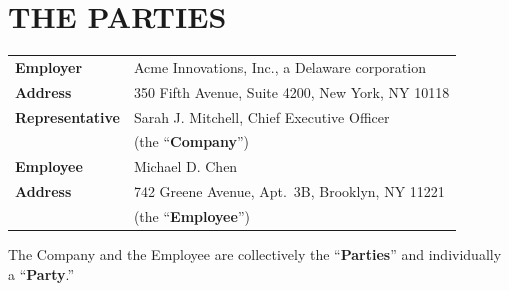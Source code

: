 \section{THE PARTIES}

\noindent
\begin{tabularx}{\linewidth}{@{}>{\color{accent}\bfseries}l@{\hspace{7mm}}V@{}}
Employer       & Acme Innovations, Inc., a Delaware corporation \\[3pt]
Address        & 350 Fifth Avenue, Suite 4200, New York, NY 10118 \\[3pt]
Representative & Sarah J. Mitchell, Chief Executive Officer \\[3pt]
               & (the ``\textbf{Company}'') \\[8pt]
Employee       & Michael D. Chen \\[3pt]
Address        & 742 Greene Avenue, Apt.~3B, Brooklyn, NY 11221 \\[3pt]
               & (the ``\textbf{Employee}'')
\end{tabularx}

\parsp
The Company and the Employee are collectively the ``\textbf{Parties}'' and individually a ``\textbf{Party}.''

